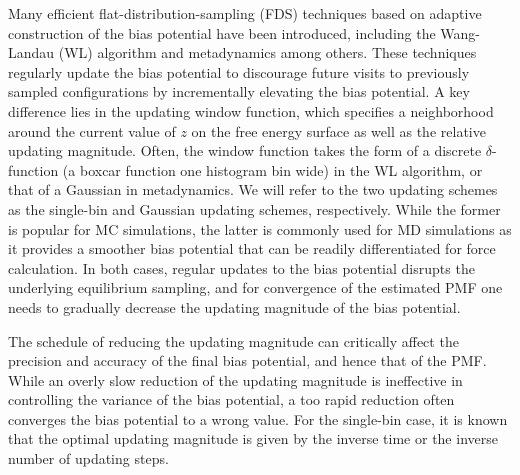 \documentclass[reprint, superscriptaddress, floatfix]{revtex4-1}
\begin{document}
Many efficient flat-distribution-sampling (FDS) techniques
based on adaptive construction of the bias potential
have been introduced,
including the Wang-Landau (WL) algorithm\cite{
  wang2001, wang2001pre}
and metadynamics\cite{huber1994,
  *laio2002, *laio2008, *barducci2011, *sutto2012, micheletti2004}
among others\cite{yan2004, kim2006, *kim2007, kim2010, junghans2014,
  langfeld2012, pellegrini2014,
  maragliano2006, *abrams2008,
  zheng2010}.
%
These techniques regularly update the bias potential
to discourage future visits to previously sampled configurations
by incrementally elevating the bias potential.
%
A key difference lies
in the updating window function,
which specifies
a neighborhood around the current value of
$z$ on the free energy surface
as well as the relative updating magnitude.
%
Often, the window function
takes the form of a discrete
$\delta$-function (a boxcar function one histogram bin wide)
in the WL algorithm,
or that of a Gaussian
in metadynamics.\cite{junghans2014}
%
We will refer to the two updating schemes
as the single-bin
and Gaussian updating schemes, respectively.
%
While the former is popular for MC simulations\cite{wang2001,
  wang2001pre, kim2006, *kim2007},
the latter is commonly used for MD simulations
as it provides a smoother bias potential
that can be readily differentiated for force calculation.\cite{huber1994,
  *laio2002, *laio2008, *barducci2011, *sutto2012, junghans2014}
%
In both cases,
regular updates to the bias potential
disrupts the underlying equilibrium
sampling\cite{zhou2005, morozov2007, zhou2008},
and for convergence of the estimated PMF
one needs to gradually decrease
the updating magnitude of the bias potential.



The schedule of reducing the updating magnitude
can critically affect the precision and accuracy
of the final bias potential,
and hence that of the PMF\cite{laio2005, bussi2006, poulain2006,
belardinelli2007, *belardinelli2007jcp, *belardinelli2008, *belardinelli2016,
liang2007, min2007,
morozov2007, zhou2008,
komura2012, *caparica2012, *caparica2014,
barducci2008, dickson2011, dama2014}.
%
While an overly slow reduction of the updating magnitude
is ineffective in controlling the variance of the bias potential,
a too rapid reduction often
converges the bias potential to a wrong value.
%
For the single-bin case, it is known that
the optimal updating magnitude is given by the
inverse time\cite{
belardinelli2007, *belardinelli2007jcp, *belardinelli2008, *belardinelli2016,
liang2007,
morozov2007, zhou2008}
or
the inverse number of updating steps.
\end{document}
